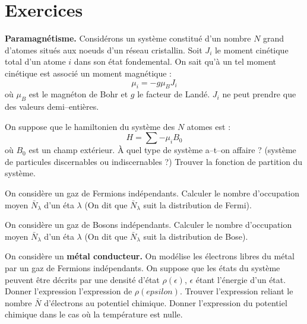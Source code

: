 \documentclass[12pt]{book}
\begin{document}
\section{Exercices}
\begin{exo}
{\bf Paramagn\'etisme.} Consid\'erons un syst\`eme constitu\'e d'un nombre $N$
grand d'atomes situ\'es aux noeuds d'un r\'eseau cristallin. Soit $J_i$ le
moment cin\'etique total d'un atome $i$ dans son \'etat fondemental. On sait
qu'\`a un tel moment cin\'etique est associ\'e un moment magn\'etique :
\begin{equation}
\mu_i=-g\mu_BJ_i
\end{equation}
o\`u $\mu_B$ est le magn\'eton de Bohr et $g$ le facteur de Land\'e. $J_i$ ne
peut prendre que des valeurs demi--enti\`eres.

On suppose que le hamiltonien du syst\`eme des $N$ atomes est :
\begin{equation}
H=\sum -\mu_i B_0
\end{equation}
o\`u $B_0$ est un champ ext\'erieur.
\`A quel type de syst\`eme a--t--on affaire ? (syst\`eme de particules
discernables ou indiscernables ?) 
Trouver la fonction de partition du syst\`eme.
\end{exo}

\begin{exo}
On consid\`ere un gaz de Fermions ind\'ependants. Calculer le nombre
d'occupation moyen $\bar 
N_\lambda$ d'un \'eta $\lambda$ (On dit que $\bar N_\lambda$ suit la
distribution de Fermi).   
\end{exo}

\begin{exo}
On consid\`ere un gaz de Bosons ind\'ependants. Calculer le nombre
d'occupation moyen $\bar 
N_\lambda$ d'un \'eta $\lambda$ (On dit que $\bar N_\lambda$ suit la
distribution de Bose).   
\end{exo}

\begin{exo}
On consid\`ere un {\bf m\'etal conducteur.} On mod\'elise les \'electrons
libres du 
m\'etal par un gaz de Fermions ind\'ependants. On suppose que les \'etats du
syst\`eme peuvent \^etre d\'ecrits par une densit\'e d'\'etat $\rho(\epsilon)$,
$\epsilon$ \'etant l'\'energie d'un \'etat. Donner l'expression l'expression
de $\rho(epsilon)$. Trouver l'expression reliant le
nombre $\bar N$ d'\'electrons au potentiel chimique. Donner l'expression du
potentiel chimique dans le cas o\`u la temp\'erature est nulle. 
\end{exo}
\end{document}

